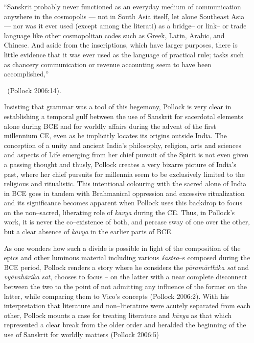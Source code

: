 \begin{myquote}
“Sanskrit probably never functioned as an everyday medium of communication anywhere in the cosmopolis — not in South Asia itself, let alone Southeast Asia — nor was it ever used (except among the literati) as a bridge– or link– or trade language like other cosmopolitan codes such as Greek, Latin, Arabic, and Chinese. And aside from the inscriptions, which have larger purposes, there is little evidence that it was ever used as the language of practical rule; tasks such as chancery communication or revenue accounting seem to have been accomplished,” 

~\hfill (Pollock 2006:14).
\end{myquote}

Insisting that grammar was a tool of this hegemony, Pollock is very clear in establishing a temporal gulf between the use of Sanskrit for sacerdotal elements alone during BCE and for worldly affairs during the advent of the first millennium CE, even as he implicitly locates its origins outside India. The conception of a unity and ancient India’s philosophy, religion, arts and sciences and aspects of Life emerging from her chief pursuit of the Spirit is not even given a passing thought and thusly, Pollock creates a very bizarre picture of India’s past, where her chief pursuits for millennia seem to be exclusively limited to the religious and ritualistic. This intentional colouring with the sacred alone of India in BCE goes in tandem with Brahmanical oppression and excessive ritualization and its significance becomes apparent when Pollock uses this backdrop to focus on the non–sacred, liberating role of \textit{kāvya} during the CE. Thus, in Pollock’s work, it is never the co–existence of both, and percase sway of one over the other, but a clear absence of \textit{kāvya} in the earlier parts of BCE.

As one wonders how such a divide is possible in light of the composition of the epics and other luminous material including various \textit{śāstra}–s composed during the BCE period, Pollock renders a story where he considers the \textit{pāramārthika sat} and \textit{vyāvahārika sat}, chooses to focus – on the latter with a near complete disconnect between the two to the point of not admitting any influence of the former on the latter, while comparing them to Vico’s concepts (Pollock 2006:2). With his interpretation that literature and non–literature were acutely separated from each other, Pollock mounts a case for treating literature and \textit{kāvya} as that which represented a clear break from the older order and heralded the beginning of the use of Sanskrit for worldly matters (Pollock 2006:5)

